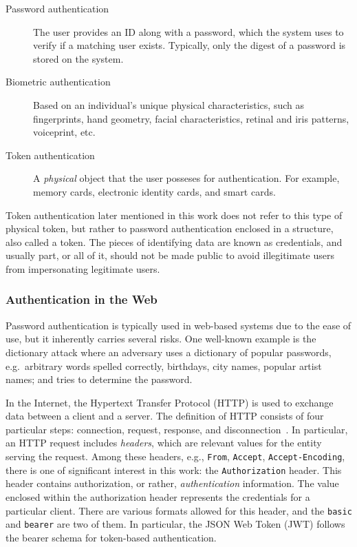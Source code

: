 \documentclass[12pt]{article}
\begin{document}
\begin{description}
\item[Password authentication] The user provides an ID along with a password, which the system uses to verify if a matching user exists. Typically, only the digest of a password is stored on the system. 
\item[Biometric authentication] Based on an individual's unique physical characteristics, such as fingerprints, hand geometry, facial characteristics, retinal and iris patterns, voiceprint, etc. 
\item[Token authentication] A \emph{physical} object that the user posseses for authentication. For example, memory cards, electronic identity cards, and smart cards. 
\end{description}

Token authentication later mentioned in this work does not refer to this type of physical token, but rather to password authentication enclosed in a structure, also called a token.
The pieces of identifying data are known as credentials, and usually part, or all of it, should not be made public to avoid illegitimate users from impersonating legitimate users.

\subsubsection{Authentication in the Web}

Password authentication is typically used in web-based systems due to the ease of use, but it inherently carries several risks. One well-known example is the dictionary attack where an adversary uses a dictionary of popular passwords, e.g.\ arbitrary words spelled correctly, birthdays, city names, popular artist names; and tries to determine the password. 

In the Internet, the Hypertext Transfer Protocol (HTTP) is used to exchange data between a client and a server. The definition of HTTP consists of four particular steps: connection, request, response, and disconnection~\cite{RFC2616}. In particular, an HTTP request includes \emph{headers}, which are relevant values for the entity serving the request. Among these headers, e.g., \texttt{From}, \texttt{Accept}, \texttt{Accept-Encoding}, there is one of significant interest in this work: the \texttt{Authorization} header. This header contains authorization, or rather, \emph{authentication} information. The value enclosed within the authorization header represents the credentials for a particular client. There are various formats allowed for this header, and the \texttt{basic} and \texttt{bearer} are two of them. In particular, the JSON Web Token (JWT) follows the bearer schema for token-based authentication.
\end{document}
